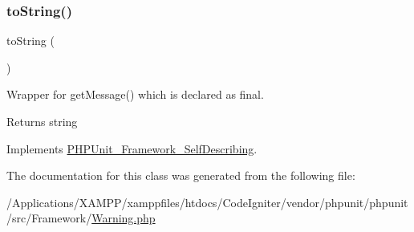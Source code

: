 \subsubsection{\texorpdfstring{to\+String()}{toString()}}
{\footnotesize\ttfamily to\+String (\begin{DoxyParamCaption}{ }\end{DoxyParamCaption})}

Wrapper for get\+Message() which is declared as final.

\begin{DoxyReturn}{Returns}
string 
\end{DoxyReturn}


Implements \mbox{\hyperlink{interface_p_h_p_unit___framework___self_describing_a5558c5d549f41597377fa1ea8a1cefa3}{P\+H\+P\+Unit\+\_\+\+Framework\+\_\+\+Self\+Describing}}.



The documentation for this class was generated from the following file\+:\begin{DoxyCompactItemize}
\item 
/\+Applications/\+X\+A\+M\+P\+P/xamppfiles/htdocs/\+Code\+Igniter/vendor/phpunit/phpunit/src/\+Framework/\mbox{\hyperlink{_warning_8php}{Warning.\+php}}\end{DoxyCompactItemize}
